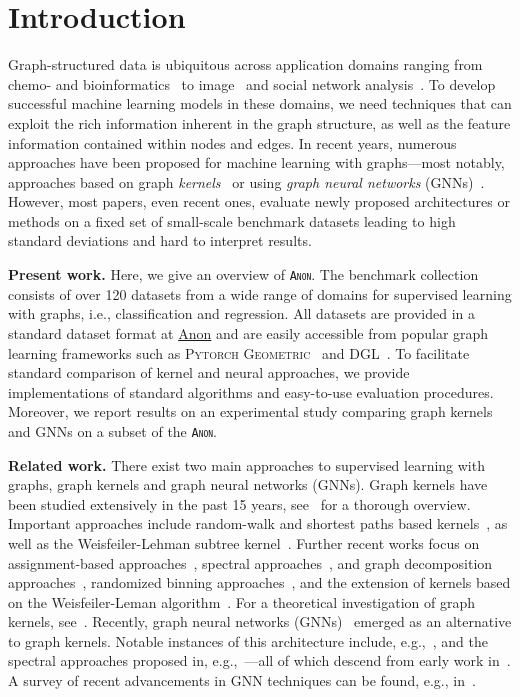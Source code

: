 \documentclass{article}
\newcommand{\xhdr}[1]{{\noindent\bfseries #1}}
\theoremstyle{definition}
\newcommand{\new}[1]{\emph{#1}}
\begin{document}
\section{Introduction}
Graph-structured data is ubiquitous across application domains ranging from chemo- and bioinformatics~\cite{Barabasi2004,Sto+2020} to image~\cite{Sim+2017} and social network analysis~\cite{Eas+2010}. To develop successful machine learning models in these domains, we need techniques that can exploit the rich information inherent in the graph structure, as well as the feature information contained within nodes and edges. In recent years, numerous approaches have been proposed for machine learning with graphs---most notably, approaches based on graph \new{kernels}~\cite{Kri+2019} or using \new{graph neural networks} (GNNs)~\cite{Gil+2017}. However, most papers, even recent ones, evaluate newly proposed architectures or methods on a fixed set of small-scale benchmark datasets leading to high standard deviations and hard to interpret results. 

\xhdr{Present work.} 
Here, we give an overview of \textsc{\texttt{Anon}}. The benchmark collection consists of over 120 datasets from a wide range of domains for supervised learning with graphs, i.e., classification and regression. All datasets are provided in a standard dataset format at \url{Anon} and are easily accessible from popular graph learning frameworks such as \textsc{Pytorch Geometric}~\cite{Fey+2019} and \textsc{DGL}~\cite{Wan+2019}. To facilitate standard comparison of kernel and neural approaches, we provide implementations of standard algorithms and easy-to-use evaluation procedures. Moreover, we report results on an experimental study comparing graph kernels and GNNs on a subset of the \textsc{\texttt{Anon}}.

\xhdr{Related work.}
There exist two main approaches to supervised learning with graphs, graph kernels and graph neural networks (GNNs). Graph kernels have been studied extensively in the past 15 years, see~\cite{Kri+2019} for a thorough overview. Important approaches include random-walk and shortest paths based kernels~\cite{Gae+2003,Sugiyama2015,Bor+2005,Kri+2017b}, as well as the Weisfeiler-Lehman subtree kernel~\cite{She+2011,Mor+2017}. 
Further recent works focus on assignment-based approaches~\cite{Kri+2016,Nik+2017}, spectral approaches~\cite{Kon+2016}, and graph decomposition approaches~\cite{Nik+2018}, randomized binning approaches~\cite{Hei+2019}, and the extension of kernels based on the Weisfeiler-Leman algorithm~\cite{Tog+2019, Rie+2019}. For a theoretical investigation of graph kernels, see~\cite{Kri+2018}. Recently, graph neural networks (GNNs)~\cite{Gil+2017,Sca+2009} emerged as an alternative to graph kernels. Notable instances of this architecture include, e.g.,~\cite{Duv+2015,Ham+2017,Vel+2018}, and the spectral approaches proposed in, e.g.,~\cite{Bru+2014,Def+2015,Kip+2017,Mon+2017}---all of which descend from early work in~\cite{Kir+1995,Mer+2005,Spe+1997,Sca+2009}. A survey of recent advancements in GNN techniques can be found, e.g., in~\cite{Cha+2020,Wu+2019,Zho+2018}.
\end{document}
